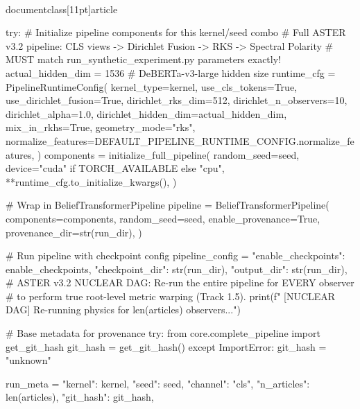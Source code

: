 \\documentclass[11pt]{article}
\begin{document}
\begin{CodeBlock}
            try:
                # Initialize pipeline components for this kernel/seed combo
                # Full ASTER v3.2 pipeline: CLS views -> Dirichlet Fusion -> RKS -> Spectral Polarity
                # MUST match run_synthetic_experiment.py parameters exactly!
                actual_hidden_dim = 1536  # DeBERTa-v3-large hidden size
                runtime_cfg = PipelineRuntimeConfig(
                    kernel_type=kernel,
                    use_cls_tokens=True,
                    use_dirichlet_fusion=True,
                    dirichlet_rks_dim=512,
                    dirichlet_n_observers=10,
                    dirichlet_alpha=1.0,
                    dirichlet_hidden_dim=actual_hidden_dim,
                    mix_in_rkhs=True,
                    geometry_mode="rks",
                    normalize_features=DEFAULT_PIPELINE_RUNTIME_CONFIG.normalize_features,
                )
                components = initialize_full_pipeline(
                    random_seed=seed,
                    device="cuda" if TORCH_AVAILABLE else "cpu",
                    **runtime_cfg.to_initialize_kwargs(),
                )

                # Wrap in BeliefTransformerPipeline
                pipeline = BeliefTransformerPipeline(
                    components=components,
                    random_seed=seed,
                    enable_provenance=True,
                    provenance_dir=str(run_dir),
                )

                # Run pipeline with checkpoint config
                pipeline_config = {
                    "enable_checkpoints": enable_checkpoints,
                    "checkpoint_dir": str(run_dir),
                    "output_dir": str(run_dir),
                }
                # ASTER v3.2 NUCLEAR DAG: Re-run the entire pipeline for EVERY observer
                # to perform true root-level metric warping (Track 1.5).
                print(f"    [NUCLEAR DAG] Re-running physics for {len(articles)} observers...")
                
                # Base metadata for provenance
                try:
                    from core.complete_pipeline import get_git_hash
                    git_hash = get_git_hash()
                except ImportError:
                    git_hash = "unknown"

                run_meta = {
                    "kernel": kernel,
                    "seed": seed,
                    "channel": "cls",
                    "n_articles": len(articles),
                    "git_hash": git_hash,
                }


\end{CodeBlock}
\end{document}
